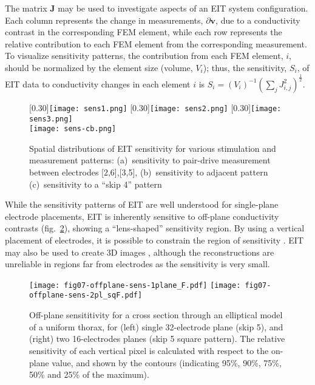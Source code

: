\documentclass[10pt,journal]{IEEEtran}\def\TBLWIDA{15mm}\def\TBLWIDB{60mm}
\newcommand\fref[1]{fig.\ \ref{#1}}
\newcommand{\vB}{\mathbf{v}}
\newcommand{\JB}{\mathbf{J}}
\begin{document}
The matrix $\JB$ may be used to investigate
aspects of an EIT system configuration. Each column
represents the change in measurements, $\partial \vB$, due to
a conductivity contrast in the corresponding FEM element, while
each row represents the relative contribution to each FEM element
from the corresponding measurement. To visualize sensitivity patterns,
the contribution from each FEM element, $i$, should be normalized by the
element size (volume, $V_i$); thus, the sensitivity, $S_i$, of EIT data to 
conductivity changes in each element $i$ is
$ S_i = (V_i)^{-1} (\sum_j J_{i,j}^2 )^{\frac{1}{2}}$.

\begin{figure} \centering
   [0.30\columnwidth]{\texttt{[image: sens1.png]}}\hfil%
   [0.30\columnwidth]{\texttt{[image: sens2.png]}}\hfil%
   [0.30\columnwidth]{\texttt{[image: sens3.png]}}\\
   \centering \texttt{[image: sens-cb.png]}\\
\caption{%
Spatial distributions of EIT sensitivity for various
stimulation and measurement patterns:
(a)~sensitivity to pair-drive measurement between electrodes [2,6],[3,5],
(b)~sensitivity to adjacent pattern
(c)~sensitivity to a ``skip 4'' pattern
}
\label{fig:sensitivity_patterns}
\end{figure}

While the sensitivity patterns of EIT are well understood for 
single-plane electrode placements, EIT is inherently sensitive
to off-plane conductivity contrasts (\fref{fig:off_plane_sensitivity}),
showing a ``lens-shaped'' sensitivity region.
By using a vertical placement of electrodes, it is possible to
constrain the region of sensitivity \cite{Grychtol20163DEIT}.
EIT may also be used to create 3D images \cite{Metherall1996Three},
although the reconstructions are unreliable in regions far from electrodes
as the sensitivity is very small.

\begin{figure} \centering
   \texttt{[image: fig07-offplane-sens-1plane\_F.pdf]}
   \texttt{[image: fig07-offplane-sens-2pl\_sqF.pdf]}
\caption{%
Off-plane sensititivity for a cross section through an elliptical
model of a uniform thorax, for 
(left)  single 32-electrode plane (skip 5), and
(right) two 16-electrodes planes  (skip 5 square pattern).
The relative sensitivity of each vertical
pixel is calculated with respect to the on-plane value, and shown by
the contours (indicating 95\%, 90\%, 75\%, 50\% and 25\% of the maximum).
}
\label{fig:off_plane_sensitivity}
\end{figure}
\end{document}

